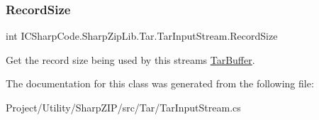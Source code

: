 \subsubsection{\texorpdfstring{Record\+Size}{RecordSize}}
{\footnotesize\ttfamily int I\+C\+Sharp\+Code.\+Sharp\+Zip\+Lib.\+Tar.\+Tar\+Input\+Stream.\+Record\+Size\hspace{0.3cm}{\ttfamily [get]}}



Get the record size being used by this stream\textquotesingle{}s \hyperlink{class_i_c_sharp_code_1_1_sharp_zip_lib_1_1_tar_1_1_tar_buffer}{Tar\+Buffer}. 



The documentation for this class was generated from the following file\+:\begin{DoxyCompactItemize}
\item 
Project/\+Utility/\+Sharp\+Z\+I\+P/src/\+Tar/Tar\+Input\+Stream.\+cs\end{DoxyCompactItemize}
